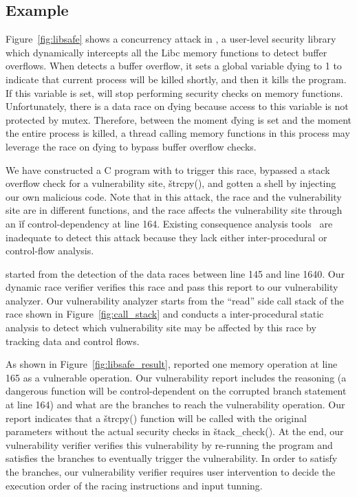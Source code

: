 \subsection{Example}\label{sec:example}
% 

Figure~\ref{fig:libsafe} shows a concurrency attack in \libsafe, a user-level 
security library which dynamically intercepts all the Libc memory functions to detect buffer 
overflows. When \libsafe detects a buffer overflow, it sets a global variable 
\v{dying} to 1 to indicate that current process will be killed shortly, and 
then it kills the program. If this variable is set, \libsafe will stop performing
security checks on memory functions. Unfortunately, there is a data 
race on \v{dying} because access to this variable is not protected by mutex. 
Therefore, between the moment \v{dying} is set and the moment the entire process 
is killed, a thread calling memory functions in this process may leverage the 
race on \v{dying} to bypass buffer overflow checks.

We have constructed a C program with \libsafe to trigger this race, bypassed a 
stack overflow check for a vulnerability site, \v{strcpy()}, and gotten a shell by 
injecting our own malicious code. Note that in this attack, the race and the 
vulnerability site are in different functions, and the race affects the
vulnerability site through an \v{if} control-dependency at line 164. Existing 
consequence 
analysis tools~\cite{conseq:asplos11,yamaguchi:sp14,livshits05finding} are 
inadequate to detect this attack because they lack either inter-procedural or 
control-flow analysis.

\xxx started from the detection of the data races between line 145 and line 1640.
Our dynamic race verifier verifies this race and pass this report to our
vulnerability analyzer. Our vulnerability analyzer starts from the ``read''
side call stack of the race shown in Figure~\ref{fig:call_stack} 
and conducts a inter-procedural static analysis to detect which vulnerability 
site may be affected by this race by tracking data and control flows.

As shown in Figure~\ref{fig:libsafe_result}, \xxx reported one memory operation 
at line 165 as a vulnerable operation. Our vulnerability report includes the 
reasoning (a dangerous function will be control-dependent on the corrupted 
branch statement at line 164) and what are the branches to reach the 
vulnerability operation. Our report indicates that a \v{strcpy()} function will 
be called with the original parameters without the actual security checks in 
\v{stack\_check()}. At the end, our vulnerability verifier verifies this 
vulnerability by re-running the program and satisfies the branches to 
eventually trigger the vulnerability. In order to satisfy the branches, our 
vulnerability verifier requires user intervention to decide the execution order 
of the racing instructions and input tunning.

